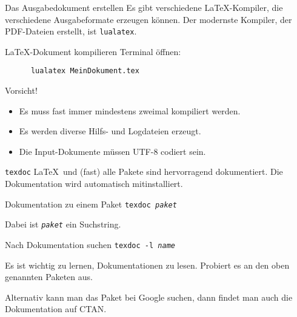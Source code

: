 \begin{frame}[fragile]{Das Ausgabedokument erstellen}
  Es gibt verschiedene \LaTeX-Kompiler, die verschiedene Ausgabeformate erzeugen können.
  Der modernste Kompiler, der PDF-Dateien erstellt, ist \alert{\texttt{lualatex}}.

  \begin{block}{\LaTeX-Dokument kompilieren}
    Terminal öffnen:
    \begin{verbatim}
      lualatex MeinDokument.tex
    \end{verbatim}
  \end{block}

  \begin{alertblock}{Vorsicht!}
    \begin{itemize}
      \item Es muss fast immer mindestens zweimal kompiliert werden.
      \item Es werden diverse Hilfs- und Logdateien erzeugt.
      \item Die Input-Dokumente müssen UTF-8 codiert sein.
    \end{itemize}
  \end{alertblock}
\end{frame}

\begin{frame}{\texttt{texdoc}}
  \LaTeX\ und (fast) alle Pakete sind hervorragend dokumentiert. Die Dokumentation wird automatisch mitinstalliert.
  \begin{block}{Dokumentation zu einem Paket}
    \texttt{texdoc \textit{paket}}
  \end{block}

  Dabei ist \texttt{\textit{paket}} ein Suchstring.
  \begin{block}{Nach Dokumentation suchen}
    \texttt{texdoc -l \textit{name}}
  \end{block}

  Es ist wichtig zu lernen, Dokumentationen zu lesen. Probiert es an den oben genannten Paketen aus.

  \vspace{10pt}
  Alternativ kann man das Paket bei Google suchen, dann findet man auch die Dokumentation auf CTAN.
\end{frame}
